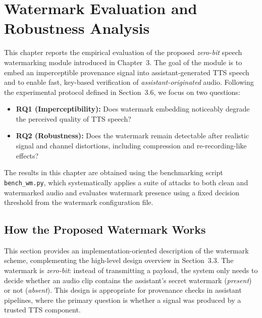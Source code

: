 
\chapter{Watermark Evaluation and Robustness Analysis}
\label{chap:watermark-results}

This chapter reports the empirical evaluation of the proposed \emph{zero-bit}
speech watermarking module introduced in Chapter~3. The goal of the module is
to embed an imperceptible provenance signal into assistant-generated TTS speech
and to enable fast, key-based verification of \emph{assistant-originated} audio.
Following the experimental protocol defined in Section~3.6, we focus on two
questions:

\begin{itemize}
    \item \textbf{RQ1 (Imperceptibility):} Does watermark embedding noticeably
    degrade the perceived quality of TTS speech?
    \item \textbf{RQ2 (Robustness):} Does the watermark remain detectable after
    realistic signal and channel distortions, including compression and
    re-recording-like effects?
\end{itemize}

The results in this chapter are obtained using the benchmarking script
\texttt{bench\_wm.py}, which systematically applies a suite of attacks to both
clean and watermarked audio and evaluates watermark presence using a fixed
decision threshold from the watermark configuration file.

\section{How the Proposed Watermark Works}
\label{sec:wm-how-it-works}

This section provides an implementation-oriented description of the watermark
scheme, complementing the high-level design overview in Section~3.3. The
watermark is \emph{zero-bit}: instead of transmitting a payload, the system only
needs to decide whether an audio clip contains the assistant's secret watermark
(\emph{present}) or not (\emph{absent}). This design is appropriate for provenance
checks in assistant pipelines, where the primary question is whether a signal was
produced by a trusted TTS component.

